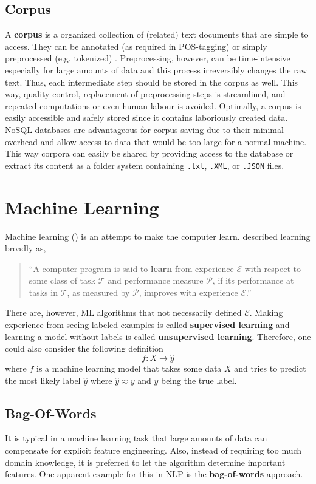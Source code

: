 \subsection{Corpus}
  A \textbf{corpus} is a organized collection of (related) text documents that are simple to access. They can be annotated (as required in POS-tagging) or simply preprocessed (e.g. tokenized) \citep{Bengfort2018}.
  Preprocessing, however, can be time-intensive especially for large amounts of data and this process irreversibly changes the raw text.
  Thus, each intermediate step should be stored in the corpus as well. This way, quality control, replacement of preprocessing steps is streamlined, and repeated computations or even human labour is avoided.
  Optimally, a corpus is easily accessible and safely stored since it contains laboriously created data.
  NoSQL databases are advantageous for corpus saving due to their minimal overhead and allow access to data that would be too large for a normal machine.
  This way corpora can easily be shared by providing access to the database or extract its content as a folder system containing \texttt{.txt}, \texttt{.XML}, or \texttt{.JSON} files.

\section{Machine Learning}
  Machine learning () is an attempt to make the computer learn. \citeauthor{Mitchell1997} described learning broadly as,
%
\begin{quote}
  ``A computer program is said to \textbf{learn} from experience $\mathcal{E}$ with respect to some class of task $\mathcal{T}$ and performance measure $\mathcal{P}$, if its performance at tasks in $\mathcal{T}$, as measured by $\mathcal{P}$, improves with experience $\mathcal{E}$.''
\end{quote}
%
  There are, however, ML algorithms that not necessarily defined $\mathcal{E}$.
  Making experience from seeing labeled examples is called \textbf{supervised learning} and learning a model without labels is called \textbf{unsupervised learning}.
  Therefore, one could also consider the following definition  \[f: X \rightarrow \hat{y}\] where $f$ is a machine learning model that takes some data $X$ and tries to predict the most likely label $\hat{y}$ where $\hat{y} \approx y$ and $y$ being the true label.

\subsection{Bag-Of-Words}\label{section:bow}
  It is typical in a machine learning task that large amounts of data can compensate for explicit feature engineering.
  Also, instead of requiring too much domain knowledge, it is preferred to let the algorithm determine important features.
  One apparent example for this in NLP is the \textbf{bag-of-words} approach.

